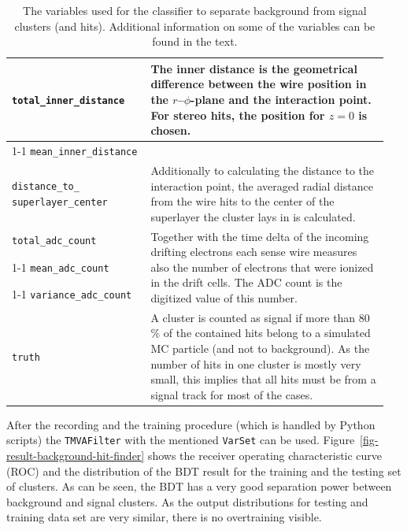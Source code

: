 \begin{table}
\begin{tabular}{p{0.35\linewidth}p{0.60\linewidth}}
   \verb+total_inner_distance+ & \multirow{3}{*}[-1.5pt]{\begin{minipage}{\linewidth} The inner distance is the geometrical difference between the wire position in the $r$--$\phi$-plane and the interaction point. For stereo hits, the position for $z = 0$ is chosen. \end{minipage}} \\[1ex] \cmidrule{1-1}
   \verb+mean_inner_distance+ & \\[1ex] \midrule
   \verb+distance_to_+ \verb+superlayer_center+ & Additionally to calculating the distance to the interaction point, the averaged radial distance from the wire hits to the center of the superlayer the cluster lays in is calculated. \\ \midrule 
   
   \verb+total_adc_count+ & \multirow{3}{*}[-1pt]{\begin{minipage}{\linewidth} Together with the time delta of the incoming drifting electrons each sense wire measures also the number of electrons that were ionized in the drift cells. The ADC count is the digitized value of this number. \end{minipage}} \\ \cmidrule{1-1}
   \verb+mean_adc_count+ & \\ \cmidrule{1-1}
   \verb+variance_adc_count+ & \\ \midrule
   \verb+truth+ & A cluster is counted as signal if more than 80 \% of the contained hits belong to a simulated MC particle (and not to background). As the number of hits in one cluster is mostly very small, this implies that all hits must be from a signal track for most of the cases. \\ \bottomrule
  \end{tabular}

  \caption{The variables used for the classifier to separate background from signal clusters (and hits). Additional information on some of the variables can be found in the text.}
  \label{tab-varset-cluster}
\end{table}

After the recording and the training procedure (which is handled by Python scripts) the \texttt{TMVAFilter} with the mentioned \texttt{VarSet} can be used. Figure~\ref{fig-result-background-hit-finder} shows the receiver operating characteristic curve (ROC) and the distribution of the BDT result for the training and the testing set of clusters. As can be seen, the BDT has a very good separation power between background and signal clusters. As the output distributions for testing and training data set are very similar, there is no overtraining visible.

